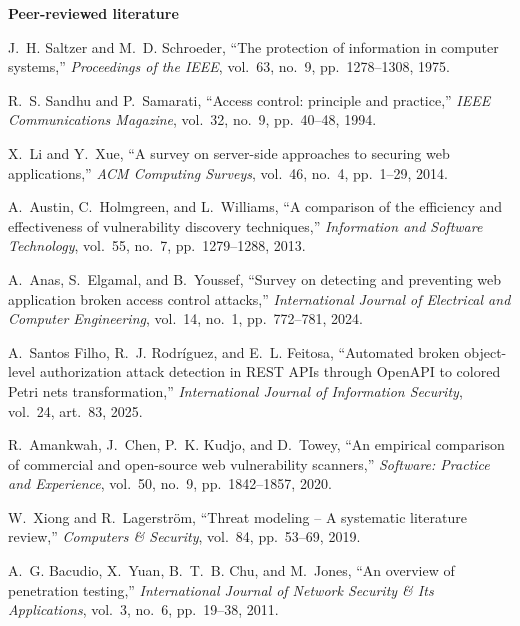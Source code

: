 \documentclass[11pt,a4paper]{article}
\begin{document}
\textbf{Peer-reviewed literature}
\begin{enumerate}[label={[}{\arabic*}{]},leftmargin=2.4em]
\item J.~H. Saltzer and M.~D. Schroeder, ``The protection of information in computer systems,'' \textit{Proceedings of the IEEE}, vol.~63, no.~9, pp.~1278--1308, 1975.
\item R.~S. Sandhu and P.~Samarati, ``Access control: principle and practice,'' \textit{IEEE Communications Magazine}, vol.~32, no.~9, pp.~40--48, 1994.
\item X.~Li and Y.~Xue, ``A survey on server-side approaches to securing web applications,'' \textit{ACM Computing Surveys}, vol.~46, no.~4, pp.~1--29, 2014.
\item A.~Austin, C.~Holmgreen, and L.~Williams, ``A comparison of the efficiency and effectiveness of vulnerability discovery techniques,'' \textit{Information and Software Technology}, vol.~55, no.~7, pp.~1279--1288, 2013.
\item A.~Anas, S.~Elgamal, and B.~Youssef, ``Survey on detecting and preventing web application broken access control attacks,'' \textit{International Journal of Electrical and Computer Engineering}, vol.~14, no.~1, pp.~772--781, 2024.
\item A.~Santos Filho, R.~J. Rodr\'iguez, and E.~L. Feitosa, ``Automated broken object-level authorization attack detection in REST APIs through OpenAPI to colored Petri nets transformation,'' \textit{International Journal of Information Security}, vol.~24, art.~83, 2025.
\item R.~Amankwah, J.~Chen, P.~K. Kudjo, and D.~Towey, ``An empirical comparison of commercial and open-source web vulnerability scanners,'' \textit{Software: Practice and Experience}, vol.~50, no.~9, pp.~1842--1857, 2020.
\item W.~Xiong and R.~Lagerstr\"om, ``Threat modeling -- A systematic literature review,'' \textit{Computers \& Security}, vol.~84, pp.~53--69, 2019.
\item A.~G. Bacudio, X.~Yuan, B.~T.~B. Chu, and M.~Jones, ``An overview of penetration testing,'' \textit{International Journal of Network Security \& Its Applications}, vol.~3, no.~6, pp.~19--38, 2011.
\end{enumerate}
\end{document}
